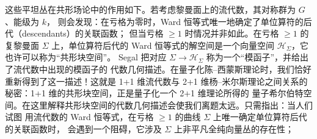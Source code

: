 \documentclass[11pt,a4paper]{article}
\begin{document}
这些平坦丛在共形场论中的作用如下。若考虑黎曼面上的流代数，其对称群为 $G$、能级为 $k$，
则会发现：在亏格为零时，Ward 恒等式唯一地确定了单位算符的后代（descendants）的关联函数；
但当亏格 $\ge1$ 时情况并非如此。在亏格 $\ge1$ 的复黎曼面 $\Sigma$ 上，单位算符后代的
Ward 恒等式的解空间是一个向量空间 $\mathcal{H}_\Sigma$，它也许可以称为“共形块空间”。
Segal 把对应 $\Sigma\to\mathcal{H}_\Sigma$ 称为一个“模函子”，并给出了流代数中出现的模函子的
代数几何描述。在量子化陈–西蒙斯理论时，我们恰好重新得到了这一描述！这就是 1+1 维流代数与
2+1 维杨–米尔斯理论之间关系的秘密：1+1 维的共形块空间，正是量子化一个 2+1 维理论所得的
量子希尔伯特空间。在这里解释共形块空间的代数几何描述会使我们离题太远。只需指出：当人们试图
用流代数的 Ward 恒等式，在亏格 $\ge1$ 的曲线 $\Sigma$ 上唯一确定单位算符后代的关联函数时，
会遇到一个阻碍，它涉及 $\Sigma$ 上非平凡全纯向量丛的存在性；





\end{document}
